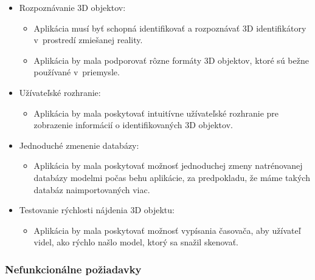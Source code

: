 \begin{itemize}
    \item Rozpoznávanie 3D objektov:
    \begin{itemize}
        \item Aplikácia musí byť schopná identifikovať a rozpoznávať 3D identifikátory v~prostredí zmiešanej reality.
        \item Aplikácia by mala podporovať rôzne formáty 3D objektov, ktoré sú bežne používané v~priemysle.
    \end{itemize}
    \item Užívateľské rozhranie:
    \begin{itemize}
        \item Aplikácia by mala poskytovať intuitívne užívateľské rozhranie pre zobrazenie informácií o identifikovaných 3D objektov.
    \end{itemize}
    \item Jednoduché zmenenie databázy:
    \begin{itemize}
        \item Aplikácia by mala poskytovať možnosť jednoduchej zmeny natrénovanej databázy modelmi počas behu aplikácie, za predpokladu, že máme takých databáz naimportovaných viac.
    \end{itemize}
    \item Testovanie rýchlosti nájdenia 3D objektu:
    \begin{itemize}
        \item Aplikácia by mala poskytovať možnosť vypísania časovača, aby užívateľ videl, ako rýchlo našlo model, ktorý sa snažil skenovať.
    \end{itemize}
\end{itemize}

\subsubsection{Nefunkcionálne požiadavky}

